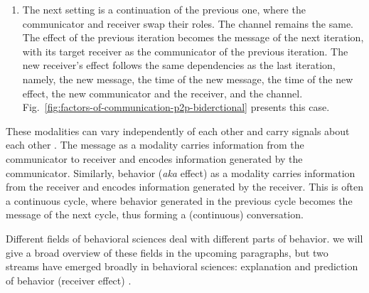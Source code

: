 \begin{enumerate}
\item The next setting is a continuation of the previous one, where the communicator and receiver swap their roles. The channel remains the same. The effect of the previous iteration becomes the message of the next iteration, with its target receiver as the communicator of the previous iteration. The new receiver's effect follows the same dependencies as the last iteration, namely, the new message, the time of the new message, the time of the new effect, the new communicator and the receiver, and the channel. Fig.~\ref{fig:factors-of-communication-p2p-biderctional} presents this case.

\end{enumerate}



These modalities can vary independently of each other \cite{khandelwal2023large,khurana-etal-2023-synthesizing,si2023long,khurana2023behavior} and carry signals about each other \cite{khurana-etal-2023-synthesizing,bhattacharya2023video}. The message as a modality carries information from the communicator to receiver and encodes information generated by the communicator. Similarly, behavior (\textit{aka} effect) as a modality carries information from the receiver and encodes information generated by the receiver. This is often a continuous cycle, where behavior generated in the previous cycle becomes the message of the next cycle, thus forming a (continuous) conversation. 







Different fields of behavioral sciences deal with different parts of behavior. we will give a broad overview of these fields in the upcoming paragraphs, but two streams have emerged broadly in behavioral sciences: explanation and prediction of behavior (receiver effect) \cite{breiman2001statistical,hofman2017prediction,shmueli2010explain}. 



